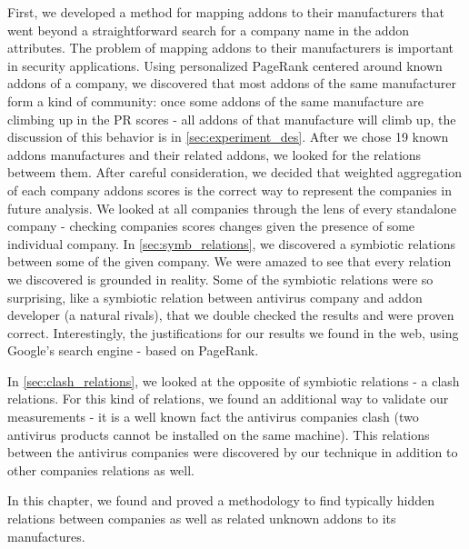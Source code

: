 \documentclass[11pt,oneside]{book}
\begin{document}
First, we developed a method for mapping addons to their manufacturers that went beyond a straightforward search for a company name in the addon attributes. The problem of mapping addons to their manufacturers is important in security applications. Using personalized PageRank centered around known addons of a company, we discovered that most addons of the same manufacturer form a kind of community: once some addons of the same manufacture are climbing up in the PR scores - all addons of that manufacture will climb up, the discussion of this behavior is in \autoref{sec:experiment_des}.
After we chose 19 known addons manufactures and their related addons, we looked for the relations betweem them.
After careful consideration, we decided that weighted aggregation of each company addons scores is the correct way to represent the companies in future analysis.
We looked at all companies through the lens of every standalone company - checking companies scores changes given the presence of some individual company.
In \autoref{sec:symb_relations}, we discovered a symbiotic relations between some of the given company. We were amazed to see that every relation we discovered is grounded in reality. Some of the symbiotic relations were so surprising, like a symbiotic relation between antivirus company and addon developer (a natural rivals), that we double checked the results and were proven correct. Interestingly, the justifications for our results we found in the web, using Google's search engine - based on PageRank.

In \autoref{sec:clash_relations}, we looked at the opposite of symbiotic relations -  a clash relations. For this kind of relations, we found an additional way to validate our measurements - it is a well known fact the antivirus companies clash (two antivirus products cannot be installed on the same machine). This relations between the antivirus companies were discovered by our technique in addition to other companies relations as well.

In this chapter, we found and proved a methodology to find typically hidden relations between companies as well as related unknown addons to its manufactures.

\end{document}
